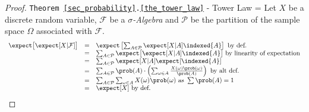 \documentclass[11pt,a4paper]{article}
\begin{document}
  \begin{proof}{\texttt{Theorem \ref{sec_probability}.\ref{the_tower_law}} - Tower Law}
    \everymath={\displaystyle}
    Let $X$ be a discrete random variable, $\mathcal{F}$ be a \textit{$\sigma$-Algebra} and $\mathcal{P}$ be the partition of the sample space $\Omega$ associated with $\mathcal{F}$.
    \[\begin{array}{rcl}
      \expect\big[\expect[X|\mathcal{F}]\big]&=&\expect\left[\sum_{A\in\mathcal{P}}\expect[X|A]\indexed\{A\}\right]\text{ by def.}\\
      &=&\sum_{A\in\mathcal{P}}\expect\big[\expect[X|A]\indexed\{A\}\big]\text{ by linearity of expectation}\\
      &=&\sum_{A\in\mathcal{P}}\expect[X|A]\expect[\indexed\{A\}]\\
      &=&\sum_{A\in\mathcal{P}}\prob(A)\cdot\left(\sum_{\omega\in A}\frac{X(\omega)\prob(\omega)}{\prob(A)}\right)\text{ by alt def.}\\
      &=&\sum_{A\in\mathcal{P}}\sum_{\omega\in A}X(\omega)\prob(\omega)\text{ as }\sum \prob(A)=1\\
      &=&\expect[X]\text{ by def.}
    \end{array}\]\proved
  \end{proof}
\end{document}

